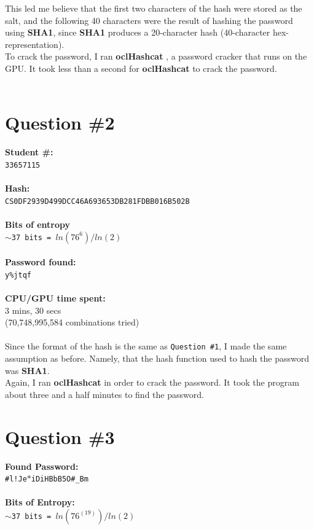 \documentclass[conference]{IEEEtran}
\begin{document}
This led me believe that the first two characters of the hash were stored as the salt, and the following 40 characters were the result of hashing the password using \textbf{SHA1}, since \textbf{SHA1} produces a 20-character hash (40-character hex-representation). \\

To crack the password, I ran \textbf{oclHashcat} \cite{oclHashcat}, a password cracker that runs on the GPU. It took less than a second for \textbf{oclHashcat} to crack the password.\\\\

\newpage

\section{Question \#2}
\noindent\textbf{Student \#:}\\
\texttt{33657115}
\\\\
\textbf{Hash:}\\
\texttt{CS0DF2939D499DCC46A693653DB281FDBB016B502B}\\\\
\textbf{Bits of entropy}\\
\texttt{$\sim$37 bits = $ln(76^6)/ln(2)$}\\\\
\textbf{Password found:}\\
\texttt{y\%jtqf}\\\\
\textbf{CPU/GPU time spent:}\\
3 mins, 30 secs\\
(70,748,995,584 combinations tried)
\\\\

Since the format of the hash is the same as \texttt{Question \#1}, I made the same assumption as before. Namely, that the hash function used to hash the password was \textbf{SHA1}.\\

Again, I ran \textbf{oclHashcat} in order to crack the password. It took the program about three and a half minutes to find the password.

\newpage

\section{Question \#3}
\textbf{Found Password:}\\
\texttt{\#l!Je$*$iDiHBbB5O\#\_Bm}\\\\
\textbf{Bits of Entropy:}\\
\texttt{$\sim$37 bits = $ln(76^(19))/ln(2)$}\\\\
\end{document}

